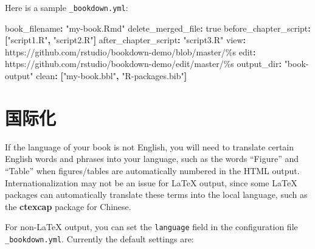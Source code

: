 \documentclass[
  12pt,
]{krantz}
\newenvironment{Shaded}{\begin{snugshade}}{\end{snugshade}}
\newcommand{\AttributeTok}[1]{\textcolor[rgb]{0.77,0.63,0.00}{#1}}
\newcommand{\CharTok}[1]{\textcolor[rgb]{0.31,0.60,0.02}{#1}}
\newcommand{\FunctionTok}[1]{\textcolor[rgb]{0.00,0.00,0.00}{#1}}
\newcommand{\KeywordTok}[1]{\textcolor[rgb]{0.13,0.29,0.53}{\textbf{#1}}}
\newcommand{\StringTok}[1]{\textcolor[rgb]{0.31,0.60,0.02}{#1}}
\theoremstyle{definition}
\theoremstyle{definition}
\theoremstyle{definition}
\theoremstyle{definition}
\theoremstyle{remark}
\begin{document}
Here is a sample \texttt{\_bookdown.yml}:

\begin{Shaded}
\begin{Highlighting}[]
\FunctionTok{book\_filename}\KeywordTok{:}\AttributeTok{ }\StringTok{"my{-}book.Rmd"}
\FunctionTok{delete\_merged\_file}\KeywordTok{:}\AttributeTok{ }\CharTok{true}
\FunctionTok{before\_chapter\_script}\KeywordTok{:}\AttributeTok{ }\KeywordTok{[}\StringTok{"script1.R"}\KeywordTok{,}\AttributeTok{ }\StringTok{"script2.R"}\KeywordTok{]}
\FunctionTok{after\_chapter\_script}\KeywordTok{:}\AttributeTok{ }\StringTok{"script3.R"}
\FunctionTok{view}\KeywordTok{:}\AttributeTok{ https://github.com/rstudio/bookdown{-}demo/blob/master/\%s}
\FunctionTok{edit}\KeywordTok{:}\AttributeTok{ https://github.com/rstudio/bookdown{-}demo/edit/master/\%s}
\FunctionTok{output\_dir}\KeywordTok{:}\AttributeTok{ }\StringTok{"book{-}output"}
\FunctionTok{clean}\KeywordTok{:}\AttributeTok{ }\KeywordTok{[}\StringTok{"my{-}book.bbl"}\KeywordTok{,}\AttributeTok{ }\StringTok{"R{-}packages.bib"}\KeywordTok{]}
\end{Highlighting}
\end{Shaded}

\hypertarget{internationalization}{%
\section{国际化}\label{internationalization}}

If the language of your book is not English, you will need to translate certain English words and phrases into your language, such as the words ``Figure'' and ``Table'' when figures/tables are automatically numbered in the HTML output. Internationalization may not be an issue for LaTeX output, since some LaTeX packages can automatically translate these terms into the local language, such as the \textbf{ctexcap} package for Chinese.

For non-LaTeX output, you can set the \texttt{language} field in the configuration file \texttt{\_bookdown.yml}. Currently the default settings are:
\end{document}
